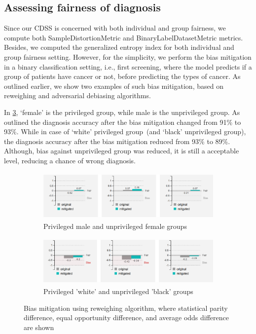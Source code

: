 \iffalse
\subsection{Assessing fairness of diagnosis}
 Since our CDSS is concerned with both individual and group fairness, we compute both SampleDistortionMetric and  BinaryLabelDatasetMetric metrics. Besides, we computed the generalized entropy index for both individual and group fairness setting. However, for the simplicity, we perform the bias mitigation in a binary classification setting, i.e., first screening, where the model predicts if a group of patients have cancer or not, before predicting the types of cancer. As outlined earlier, we show two examples of such bias mitigation, based on reweighing and adversarial debiasing algorithms. 

\hspace*{3.5mm} In \cref{fig:debiases_1}, `female' is the privileged group, while male is the unprivileged group. As outlined the diagnosis accuracy after the bias mitigation changed from 91\% to 93\%. While in case of `white' privileged group~(and `black' unprivileged group), the diagnosis accuracy after the bias mitigation reduced from 93\% to 89\%. Although, bias against unprivileged group was reduced, it is still a acceptable level, reducing a chance of wrong diagnosis.  

\begin{figure}[h]
	\centering
	\begin{subfigure}{.48\linewidth}
		\centering
		\includegraphics[width=\linewidth,height=25mm]{images/debias_1.png}
		\caption{Privileged male and unprivileged female groups}
		 \label{fig:debias_1}
	\end{subfigure}
	\begin{subfigure}{0.48\linewidth}
		\centering
		\includegraphics[width=\linewidth,height=25mm]{images/debias_2.png}
		\caption{Privileged 'white' and unprivileged 'black' groups}
        \label{fig:debias_2}
	\end{subfigure}
	\caption[Bias mitigation using reweighing algorithm]{Bias mitigation using reweighing algorithm, where statistical parity difference, equal opportunity difference, and average odds difference are shown}
	\label{fig:debiases_1}
	\vspace{-2mm}
\end{figure}

